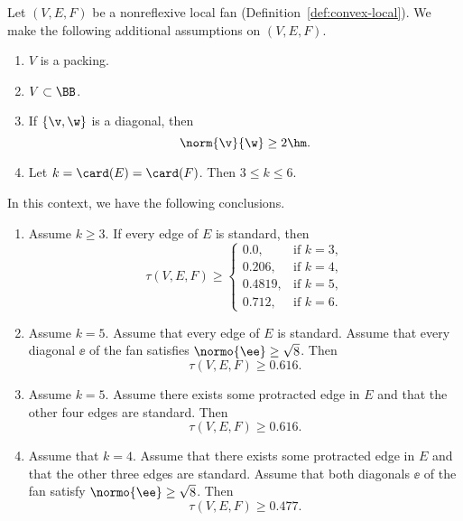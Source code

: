 \begin{theorem}\label{lemma:main-estimate}
Let $(V,E,F)$ be a nonreflexive local fan (Definition~\ref{def:convex-local}).
We make the following additional
assumptions on $(V,E,F)$.
\begin{enumerate}
\item {} $V$ is a packing.  
\item {} $V\subset \BB$.
\item {} If $\{\v,\w\}$ is a diagonal,  then 
\[ 
\norm{\v}{\w}\ge 2\hm.
\] 
\item {} 
Let   $k=\card(E)=\card(F)$.  Then $3\le k \le 6$.
\end{enumerate}
In this context, we have the following conclusions.
\begin{enumerate}
\item Assume $k\ge 3$.  If  every edge of $E$ is standard, then
\[ 
\tau(V,E,F) \ge
\begin{cases}
  0.0,&\text{if }k=3,\\
  0.206,&\text{if }k=4,\\
  0.4819,&\text{if }k=5,\\
  0.712,&\text{if }k=6.
\end{cases}
\] 
\item Assume $k=5$.  Assume that every edge of $E$ is standard.
Assume that every diagonal $\ee$ of the fan satisfies $\normo{\ee}\ge\sqrt{8}$.
Then 
\begin{equation}
\tau(V,E,F)\ge 0.616. \tag{check:pent\_diag\_cs}
\end{equation}
\item Assume $k=5$.  Assume there exists some protracted edge in $E$ 
and that the other four edges are standard.  Then 
\begin{equation}
\tau(V,E,F)\ge 0.616. \tag{check:pent\_pro\_cs}
\end{equation}
\item Assume that $k=4$.  Assume that there exists some protracted
 edge in $E$ and that the other three edges are standard.  
Assume that both diagonals $\ee$ of the fan satisfy $\normo{\ee}\ge\sqrt{8}$.
Then
\begin{equation}
\tau(V,E,F)\ge 0.477. \tag{check:quad\_pro\_cs}

\end{equation}
\end{enumerate}
\end{theorem}
